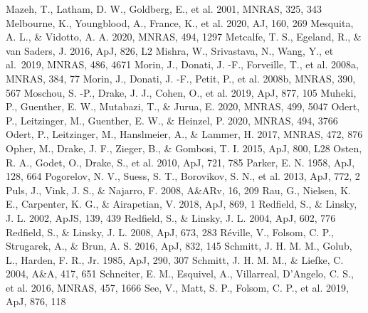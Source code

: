 \documentclass[preprint]{aastex}
\begin{document}
\begin{thebibliography}{}
Mazeh, T., Latham, D. W., Goldberg, E., et al. 2001, MNRAS, 325, 343
Melbourne, K., Youngblood, A., France, K., et al. 2020, AJ, 160, 269
Mesquita, A. L., \& Vidotto, A. A. 2020, MNRAS, 494, 1297
Metcalfe, T. S., Egeland, R., \& van Saders, J. 2016, ApJ, 826, L2
Mishra, W., Srivastava, N., Wang, Y., et al.\ 2019, MNRAS, 486, 4671
Morin, J., Donati, J. -F., Forveille, T., et al. 2008a, MNRAS, 384, 77
Morin, J., Donati, J. -F., Petit, P., et al. 2008b, MNRAS, 390, 567
Moschou, S. -P., Drake, J. J., Cohen, O., et al. 2019, ApJ, 877, 105
Muheki, P., Guenther, E. W., Mutabazi, T., \& Jurua, E. 2020, MNRAS,
  499, 5047
Odert, P., Leitzinger, M., Guenther, E. W., \& Heinzel, P. 2020,
  MNRAS, 494, 3766
Odert, P., Leitzinger, M., Hanslmeier, A., \& Lammer, H. 2017,
  MNRAS, 472, 876
Opher, M., Drake, J. F., Zieger, B., \& Gombosi, T. I. 2015, ApJ, 800, L28
Osten, R. A., Godet, O., Drake, S., et al. 2010, ApJ, 721, 785
Parker, E. N. 1958, ApJ, 128, 664
Pogorelov, N. V., Suess, S. T., Borovikov, S. N., et al. 2013, ApJ, 772, 2
Puls, J., Vink, J. S., \& Najarro, F. 2008, A\&ARv, 16, 209
Rau, G., Nielsen, K. E., Carpenter, K. G., \& Airapetian, V. 2018,
  ApJ, 869, 1
Redfield, S., \& Linsky, J. L. 2002, ApJS, 139, 439
Redfield, S., \& Linsky, J. L. 2004, ApJ, 602, 776
Redfield, S., \& Linsky, J. L. 2008, ApJ, 673, 283
R\'{e}ville, V., Folsom, C. P., Strugarek, A., \& Brun, A. S. 2016,
  ApJ, 832, 145
Schmitt, J. H. M. M., Golub, L., Harden, F. R., Jr. 1985, ApJ, 290, 307
Schmitt, J. H. M. M., \& Liefke, C. 2004, A\&A, 417, 651
Schneiter, E. M., Esquivel, A., Villarreal, D'Angelo, C. S., et al.
  2016, MNRAS, 457, 1666
See, V., Matt, S. P., Folsom, C. P., et al. 2019, ApJ, 876, 118

\end{thebibliography}
\end{document}

